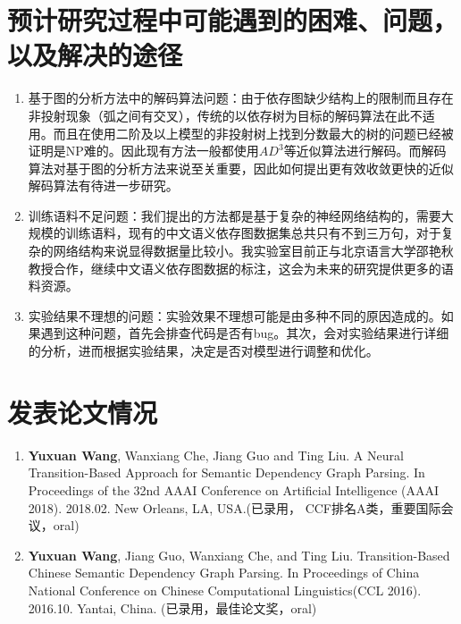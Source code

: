 \section{预计研究过程中可能遇到的困难、问题，以及解决的途径}

\begin{enumerate}
	\item 基于图的分析方法中的解码算法问题：由于依存图缺少结构上的限制而且存在非投射现象（弧之间有交叉），传统的以依存树为目标的解码算法在此不适用。而且在使用二阶及以上模型的非投射树上找到分数最大的树的问题已经被证明是NP难的。因此现有方法一般都使用$AD^3$等近似算法进行解码。而解码算法对基于图的分析方法来说至关重要，因此如何提出更有效收敛更快的近似解码算法有待进一步研究。
	\item 训练语料不足问题：我们提出的方法都是基于复杂的神经网络结构的，需要大规模的训练语料，现有的中文语义依存图数据集总共只有不到三万句，对于复杂的网络结构来说显得数据量比较小。我实验室目前正与北京语言大学邵艳秋教授合作，继续中文语义依存图数据的标注，这会为未来的研究提供更多的语料资源。
	\item 实验结果不理想的问题：实验效果不理想可能是由多种不同的原因造成的。如果遇到这种问题，首先会排查代码是否有bug。其次，会对实验结果进行详细的分析，进而根据实验结果，决定是否对模型进行调整和优化。
\end{enumerate}

\section{发表论文情况}
\begin{enumerate}
	\item \textbf{Yuxuan Wang}, Wanxiang Che, Jiang Guo and Ting Liu. A Neural Transition-Based Approach for Semantic Dependency Graph Parsing. In Proceedings of the 32nd AAAI Conference on Artificial Intelligence (AAAI 2018). 2018.02. New Orleans, LA, USA.(已录用， CCF排名A类，重要国际会议，oral)
	\item \textbf{Yuxuan Wang}, Jiang Guo,  Wanxiang Che, and Ting Liu. Transition-Based Chinese Semantic Dependency Graph Parsing. In Proceedings of China National Conference on Chinese Computational Linguistics(CCL 2016). 2016.10. Yantai, China. (已录用，最佳论文奖，oral)
\end{enumerate}

\clearpage

\newpage